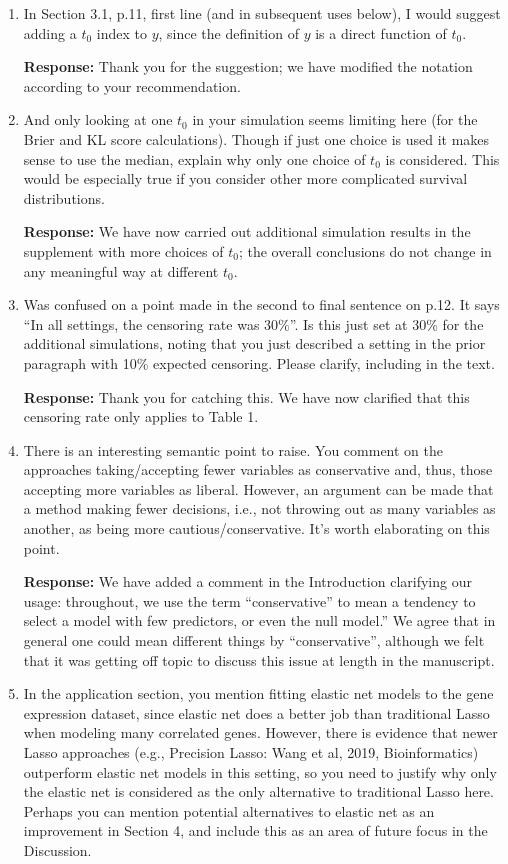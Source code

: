 \documentclass{article}
\newcommand{\re}{\textbf{Response: }}
\begin{document}
\begin{enumerate}[align = left]
  \re Thank you for the suggestion; we have added the sentence as you suggest.

\item In Section 3.1, p.11, first line (and in subsequent uses below), I would suggest adding a $t_0$ index to $y$, since the definition of $y$ is a direct function of $t_0$.

  \re Thank you for the suggestion; we have modified the notation according to your recommendation.

\item And only looking at one $t_0$ in your simulation seems limiting here (for the Brier and KL score calculations). Though if just one choice is used it makes sense to use the median, explain why only one choice of $t_0$ is considered.  This would be especially true if you consider other more complicated survival distributions.

  \re We have now carried out additional simulation results in the supplement with more choices of $t_0$; the overall conclusions do not change in any meaningful way at different $t_0$.

\item Was confused on a point made in the second to final sentence on p.12. It says “In all settings, the censoring rate was 30$\%$”. Is this just set at 30$\%$ for the additional simulations, noting that you just described a setting in the prior paragraph with 10$\%$ expected censoring. Please clarify, including in the text.

\re Thank you for catching this. We have now clarified that this censoring rate only applies to Table 1.

\item There is an interesting semantic point to raise. You comment on the approaches taking/accepting fewer variables as conservative and, thus, those accepting more variables as liberal. However, an argument can be made that a method making fewer decisions, i.e., not throwing out as many variables as another, as being more cautious/conservative. It’s worth elaborating on this point.

  \re We have added a comment in the Introduction clarifying our usage: throughout, we use the term ``conservative'' to mean a tendency to select a model with few predictors, or even the null model.'' We agree that in general one could mean different things by ``conservative'', although we felt that it was getting off topic to discuss this issue at length in the manuscript.

\item In the application section, you mention fitting elastic net models to the gene expression dataset, since elastic net does a better job than traditional Lasso when modeling many correlated genes. However, there is evidence that newer Lasso approaches (e.g., Precision Lasso: Wang et al, 2019, Bioinformatics) outperform elastic net models in this setting, so you need to justify why only the elastic net is considered as the only alternative to traditional Lasso here. Perhaps you can mention potential alternatives to elastic net as an improvement in Section 4, and include this as an area of future focus in the Discussion.


\end{enumerate}
\end{document}
